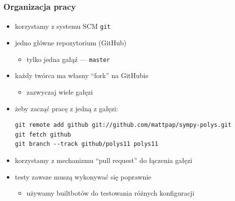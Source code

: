 \documentclass[10pt]{beamer}
\begin{document}
\begin{frame}[fragile]
    \frametitle{Organizacja pracy}
    \framesubtitle{}

    \begin{itemize}
        \item korzystamy z systemu SCM \texttt{git}
        \pause
        \item jedno główne repozytorium (GitHub)
            \begin{itemize}
                \item tylko jedna gałąź --- \texttt{master}
            \end{itemize}
        \item każdy twórca ma własny ``fork'' na GitHubie
            \begin{itemize}
                \item zazwyczaj wiele gałęzi
            \end{itemize}
        \pause
        \item żeby zacząć pracę z jedną z gałęzi:
            {\small
            \begin{verbatim}
git remote add github git://github.com/mattpap/sympy-polys.git
git fetch github
git branch --track github/polys11 polys11
            \end{verbatim}}
        \pause
        \item korzystamy z mechanizmu ``pull request'' do łączenia gałęzi
        \pause
        \item testy zawsze muszą wykonywać się poprawnie
            \begin{itemize}
                \item używamy builtbotów do testowania różnych konfiguracji
            \end{itemize}
    \end{itemize}
\end{frame}
\end{document}
